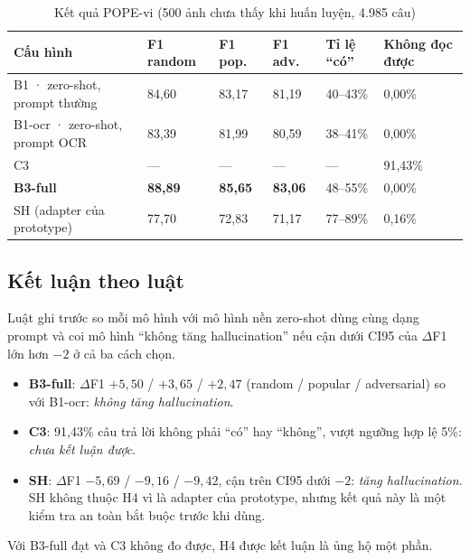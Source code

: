 \begin{table}[htbp]
\caption{Kết quả POPE-vi (500 ảnh chưa thấy khi huấn luyện, 4.985 câu)}
\label{tab:dis-pope}
\centering
\small
\begin{tabular}{p{}p{}p{}p{}p{}p{}}
\toprule
\textbf{Cấu hình} & \textbf{F1 random} & \textbf{F1 pop.} & \textbf{F1 adv.} & \textbf{Tỉ lệ ``có''} & \textbf{Không đọc được} \\
\midrule
B1 · zero-shot, prompt thường & 84,60 & 83,17 & 81,19 & 40--43\% & 0,00\% \\
B1-ocr · zero-shot, prompt OCR & 83,39 & 81,99 & 80,59 & 38--41\% & 0,00\% \\
C3 & --- & --- & --- & --- & 91,43\% \\
\textbf{B3-full} & \textbf{88,89} & \textbf{85,65} & \textbf{83,06} & 48--55\% & 0,00\% \\
SH (adapter của prototype) & 77,70 & 72,83 & 71,17 & 77--89\% & 0,16\% \\
\bottomrule
\end{tabular}
\end{table}

\subsection{Kết luận theo luật}

Luật ghi trước so mỗi mô hình với mô hình nền zero-shot dùng cùng dạng prompt và
coi mô hình ``không tăng hallucination'' nếu cận dưới CI95 của $\Delta$F1 lớn hơn
$-2$ ở cả ba cách chọn.

\begin{itemize}
  \item \textbf{B3-full}: $\Delta$F1 $+5{,}50$ / $+3{,}65$ / $+2{,}47$ (random /
  popular / adversarial) so với B1-ocr: \emph{không tăng hallucination}.
  \item \textbf{C3}: 91,43\% câu trả lời không phải ``có'' hay ``không'', vượt
  ngưỡng hợp lệ 5\%: \emph{chưa kết luận được}.
  \item \textbf{SH}: $\Delta$F1 $-5{,}69$ / $-9{,}16$ / $-9{,}42$, cận trên CI95
  dưới $-2$: \emph{tăng hallucination}. SH không thuộc H4 vì là adapter của
  prototype, nhưng kết quả này là một kiểm tra an toàn bắt buộc trước khi dùng.
\end{itemize}

Với B3-full đạt và C3 không đo được, H4 được kết luận là ủng hộ một phần.

